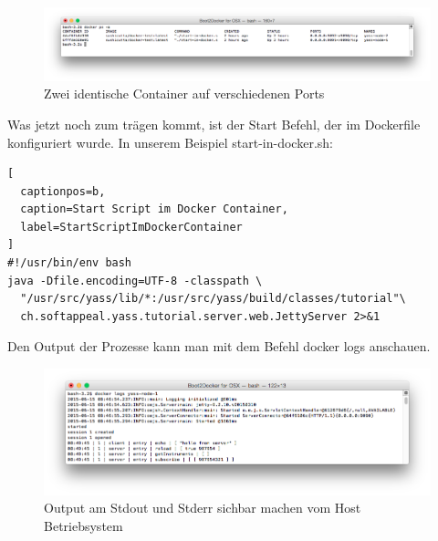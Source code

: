 \begin{figure}[htbp]
  \begin{center}
    \includegraphics[width=1.0\textwidth]{./images/twoProcesses.png}
    \caption{Zwei identische Container auf verschiedenen Ports}
    \label{img:twoProcesses}
  \end{center}
\end{figure}

Was jetzt noch zum trägen kommt, ist der Start Befehl, der im Dockerfile
konfiguriert wurde. In unserem Beispiel start-in-docker.sh:
\\

\begin{lstlisting}[
  captionpos=b,
  caption=Start Script im Docker Container,
  label=StartScriptImDockerContainer
]
#!/usr/bin/env bash
java -Dfile.encoding=UTF-8 -classpath \
  "/usr/src/yass/lib/*:/usr/src/yass/build/classes/tutorial"\
  ch.softappeal.yass.tutorial.server.web.JettyServer 2>&1
\end{lstlisting}

Den Output der Prozesse kann man mit dem Befehl docker logs anschauen.

\begin{figure}[htbp]
  \begin{center}
    \includegraphics[width=1.0\textwidth]{./images/logOutput.png}
    \caption{Output am Stdout und Stderr sichbar machen vom Host Betriebsystem}
    \label{img:logOutput}
  \end{center}
\end{figure}





